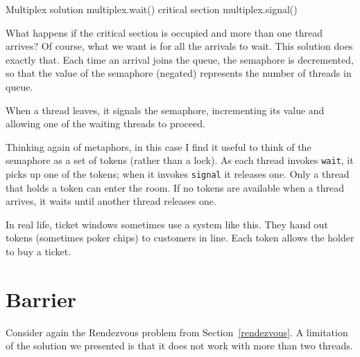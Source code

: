 \begin{lstbox}{Multiplex solution}
multiplex.wait()
    critical section 
multiplex.signal()      
\end{lstbox}

What happens if the critical section is occupied and more than one
thread arrives?  Of course, what we want is for all the arrivals to
wait.  This solution does exactly that.  Each time an arrival joins
the queue, the semaphore is decremented, so that the value of the
semaphore (negated) represents the number of threads in queue.

When a thread leaves, it signals the semaphore, incrementing
its value and allowing one of the waiting threads to proceed.

Thinking again of metaphors, in this case I find it useful
to think of the semaphore as a set of tokens (rather than
a lock).
As each thread invokes {\tt wait}, it picks up one of
the tokens; when it invokes {\tt signal} it releases one.
Only a thread that holds a token can enter the room.  If no
tokens are available when a thread arrives, it waits until
another thread releases one.

In real life, ticket windows sometimes use a system like
this.  They hand out tokens (sometimes poker chips) to
customers in line.  Each token allows the holder to buy a ticket.


\section{Barrier}

Consider again the Rendezvous problem from Section~\ref{rendezvous}.
A limitation of the solution we presented is that it does
not work with more than two threads.

